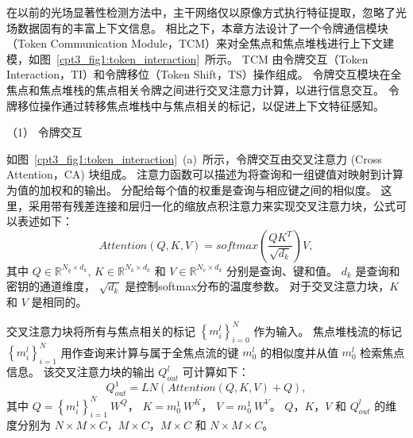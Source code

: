 在以前的光场显著性检测方法中，主干网络仅以原像方式执行特征提取，忽略了光场数据固有的丰富上下文信息。 相比之下，本章方法设计了一个令牌通信模块（Token Communication Module，TCM）来对全焦点和焦点堆栈进行上下文建模，如图~\ref{cpt3_fig1:token_interaction}~所示。
TCM 由令牌交互（Token Interaction，TI）和令牌移位（Token Shift，TS）操作组成。 
令牌交互模块在全焦点和焦点堆栈的焦点相关令牌之间进行交叉注意力计算，以进行信息交互。 
令牌移位操作通过转移焦点堆栈中与焦点相关的标记，以促进上下文特征感知。 








（1）
令牌交互


如图~\ref{cpt3_fig1:token_interaction}~(a)~所示，令牌交互由交叉注意力 (Cross Attention，CA) 块组成。 
注意力函数可以描述为将查询和一组键值对映射到计算为值的加权和的输出。 
分配给每个值的权重是查询与相应键之间的相似度。 
这里，采用带有残差连接和层归一化的缩放点积注意力来实现交叉注意力块，公式可以表述如下：
%
%
%
\begin{equation}
	Attention(Q,K,V) = softmax \left ( \frac{QK^{T}}{\sqrt{d_{k}}} \right ) V,
\end{equation}
%
%
其中
$ Q \in \mathbb{R}^{N_{q}\times d_{k}}  $,
$ K \in \mathbb{R}^{N_{k}\times d_{k}}  $ 和
$ V \in \mathbb{R}^{N_{v}\times d_{k}}  $ 
分别是查询、键和值。 
$ d_{k} $ 是查询和密钥的通道维度，
$ \sqrt{d_{k}} $ 是控制softmax分布的温度参数。 
对于交叉注意力块，$K$ 和 $V$ 是相同的。 






交叉注意力块将所有与焦点相关的标记 $ \left \{ m_{i}^{l} \right \}_{i=0}^{N} $ 作为输入。 焦点堆栈流的标记 $ \left \{  m_{i}^{l} \right \}_{i=1}^{N} $ 用作查询来计算与属于全焦点流的键 $ m_{0}^{l} $ 的相似度并从值 $ m_{0}^{l} $ 检索焦点信息。 该交叉注意力块的输出 $ Q_{out}^{l} $ 可计算如下：
%
%
\begin{equation}
	Q_{out}^{1} = LN \left ( Attention(Q,K,V) + Q \right ),
\end{equation}
%
%
其中
$ Q = \left \{ m_{i}^{1} \right \}_{i=1}^{N}~ W^{Q}$，
$ K= m_{0}^{1} ~W^{K} $，
$ V =  m_{0}^{1}~ W^{V} $。
$ Q$，$K$，$V$ 和 $ Q_{out}^{l} $
的维度分别为 
$ N \times M \times C $，$ M \times C $，$ M \times C $ 
和
 $ N \times M \times C $。 


















